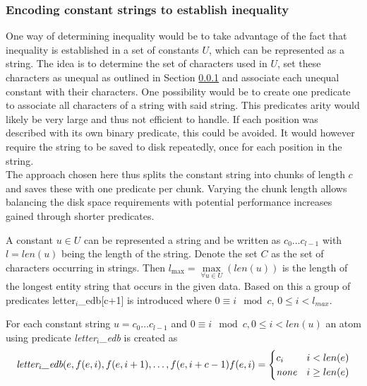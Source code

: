 \documentclass[hyperref,bachelorofscience,fleqn]{cgvpub}
\begin{document}
\subsubsection{Encoding constant strings to establish inequality}\label{subsubsec_encoding}
One way of determining inequality would be to take advantage of the fact that inequality is established in a set of constants \(U\), which can be represented as a string. The idea is to determine the set of characters used in \(U\), set these characters as unequal as outlined in Section \ref{subsubsec_encoding} and associate each unequal constant with their characters. One possibility would be to create one predicate to associate all characters of a string with said string. This predicates arity would likely be very large and thus not efficient to handle. If each position was described with its own binary predicate, this could be avoided. It would however require the string to be saved to disk repeatedly, once for each position in the string.\\

The approach chosen here thus splits the constant string into chunks of length \(c\) and saves these with one predicate per chunk. Varying the chunk length allows balancing the disk space requirements with potential performance increases gained through shorter predicates.

A constant \(u \in U\) can be represented a string and be written as \(c_0 \ldots c_{l - 1}\) with \(l = len(u)\) being the length of the string. Denote the set \(C\) as the set of characters occurring in strings. Then \(l_{\max} = \max\limits_{\forall u \in U}(len(u))\) is the length of the longest entity string that occurs in the given data.
Based on this a group of predicates letter\(_i\)\_edb[c+1] is introduced where \(0 \equiv i \mod c\), \(0 \leq i < l_{max} \). 

For each constant string \(u = c_0 \ldots c_{l - 1}\) and \(0 \equiv i \mod c, 0 \leq i < len(u)\) an atom using predicate \emph{letter\(_i\)\_edb} is created as 
\begin{align}
\begin{split}
\emph{letter}_i\emph{\_edb}(e, f(e, i), f(e, i+1), \ldots, f(e, i+c-1)
\end{split}
\begin{split}
f(e, i) = 
\begin{cases}
      c_i & i < len(e) \\
      \emph{none} & i \geq len(e)
\end{cases}
\end{split}
\end{align}
\end{document}
